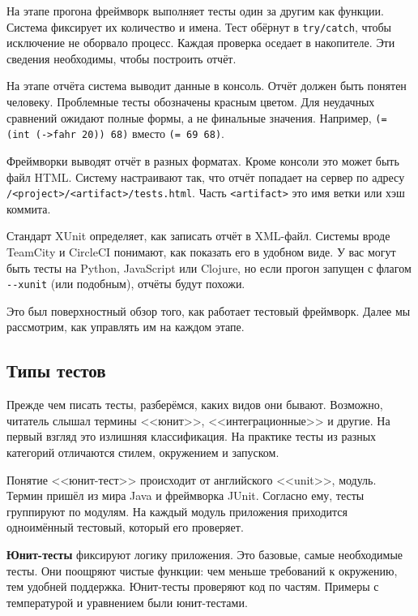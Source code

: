 На этапе прогона фреймворк выполняет тесты один за другим как функции. Система
фиксирует их количество и имена. Тест обёрнут в \verb|try/catch|, чтобы
исключение не оборвало процесс. Каждая проверка оседает в накопителе. Эти
сведения необходимы, чтобы построить отчёт.

На этапе отчёта система выводит данные в консоль. Отчёт должен быть понятен
человеку. Проблемные тесты обозначены красным цветом. Для неудачных сравнений
ожидают полные формы, а не финальные значения. Например,
\verb|(= (int (->fahr 20)) 68)| вместо \verb|(= 69 68)|.

Фреймворки выводят отчёт в разных форматах. Кроме консоли это может быть файл
HTML. Систему настраивают так, что отчёт попадает на сервер по адресу
\verb|/<project>/<artifact>/tests.html|. Часть \verb|<artifact>| это имя
ветки или хэш коммита.

Стандарт XUnit определяет, как записать отчёт в XML-файл. Системы вроде TeamCity
и CircleCI понимают, как показать его в удобном виде. У вас могут быть тесты на
Python, JavaScript или Clojure, но если прогон запущен с флагом \verb|--xunit|
(или подобным), отчёты будут похожи.

Это был поверхностный обзор того, как работает тестовый фреймворк. Далее мы
рассмотрим, как управлять им на каждом этапе.

\subsection{Типы тестов}


Прежде чем писать тесты, разберёмся, каких видов они бывают. Возможно, читатель
слышал термины <<юнит>>, <<интеграционные>> и другие. На первый взгляд это
излишняя классификация. На практике тесты из разных категорий отличаются стилем,
окружением и запуском.

Понятие <<юнит-тест>> происходит от английского <<unit>>, модуль. Термин пришёл
из мира Java и фреймворка JUnit. Согласно ему, тесты группируют по модулям. На
каждый модуль приложения приходится одноимённый тестовый, который его проверяет.

\textbf{Юнит-тесты} фиксируют логику приложения. Это базовые, самые необходимые
тесты. Они поощряют чистые функции: чем меньше требований к окружению, тем
удобней поддержка. Юнит-тесты проверяют код по частям. Примеры с температурой и
уравнением были юнит-тестами.


